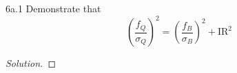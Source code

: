 
\begin{problem}{6a.1}
Demonstrate that \[\left( \frac{f_{Q}}{\sigma_{Q}} \right)^{2} = \left( \frac{f_{B}}{\sigma_{B}} \right)^{2} + \mathrm{IR}^{2}\]
\end{problem}

\begin{proof}[Solution]

\end{proof}